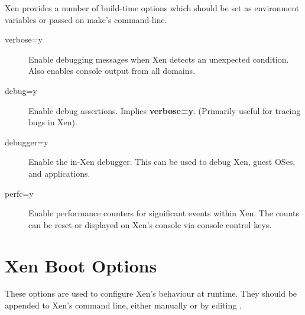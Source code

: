\documentclass[11pt,twoside,final,openright]{report}
\begin{document}
Xen provides a number of build-time options which should be set as
environment variables or passed on make's command-line.

\begin{description}
\item[verbose=y] Enable debugging messages when Xen detects an
  unexpected condition.  Also enables console output from all domains.
\item[debug=y] Enable debug assertions.  Implies {\bf verbose=y}.
  (Primarily useful for tracing bugs in Xen).
\item[debugger=y] Enable the in-Xen debugger. This can be used to
  debug Xen, guest OSes, and applications.
\item[perfc=y] Enable performance counters for significant events
  within Xen. The counts can be reset or displayed on Xen's console
  via console control keys.
\end{description}


\section{Xen Boot Options}
\label{s:xboot}

These options are used to configure Xen's behaviour at runtime.  They
should be appended to Xen's command line, either manually or by
editing .
\end{document}
